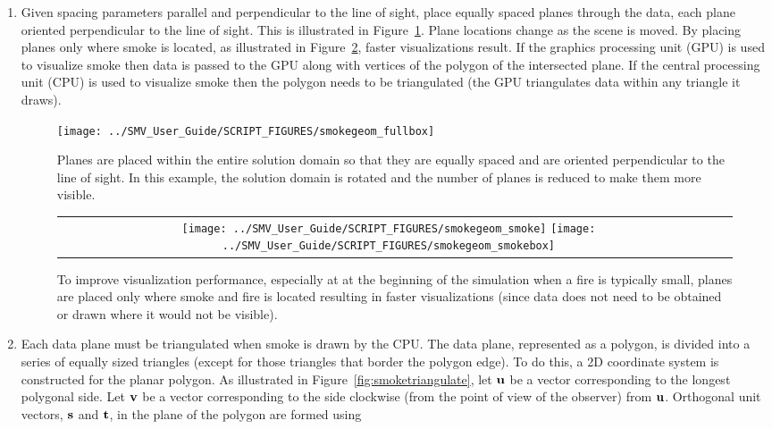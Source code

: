 {\begin{enumerate}
\item Given spacing parameters parallel and perpendicular to the line of sight, place
equally spaced planes
through the data, each plane oriented perpendicular to the line of sight.
This is illustrated in Figure~\ref{fig:smokeplanes}. Plane locations change as
the scene is moved.  By placing planes only where smoke is located, as illustrated in
Figure~\ref{fig:smokebox}, faster visualizations result.
If the graphics processing unit (GPU) is used to visualize smoke then data is passed to the GPU along with
vertices of the polygon of the intersected plane.  If the central processing unit (CPU) is used to visualize smoke then
the polygon needs to be triangulated (the GPU triangulates data within any triangle it draws).


\begin{figure}[bph]
\begin{center}
\texttt{[image: ../SMV\_User\_Guide/SCRIPT\_FIGURES/smokegeom\_fullbox]}
\end{center}
\caption{Planes are placed within the entire solution domain so that they are equally spaced and are oriented perpendicular to the line of sight. In this example, the solution domain is rotated and the number of planes is reduced to make them more visible. }
\label{fig:smokeplanes}
\end{figure}


\begin{figure}[bph]
\begin{center}
\begin{tabular}{cc}
\texttt{[image: ../SMV\_User\_Guide/SCRIPT\_FIGURES/smokegeom\_smoke]}
\texttt{[image: ../SMV\_User\_Guide/SCRIPT\_FIGURES/smokegeom\_smokebox]}
\end{tabular}
\end{center}
\caption{To improve visualization performance, especially at at the beginning of the
simulation when a fire is typically small, planes are placed only where smoke and fire is located resulting in faster visualizations (since
data does not need to be obtained or drawn where it would not be visible).}
\label{fig:smokebox}
\end{figure}

\item Each data plane must be triangulated when smoke is drawn by the CPU.  The data plane,
represented as a polygon, is divided into a series of equally sized triangles
(except for those triangles that border the polygon edge). To do this,
    a 2D coordinate
    system is constructed for the planar polygon. As illustrated in Figure~\ref{fig:smoketriangulate},
    let $\mathbf{u}$ be a vector corresponding to the longest
    polygonal side.  Let $\mathbf{v}$ be a vector corresponding to the side clockwise
    (from the point of view of the observer) from $\mathbf{u}$. Orthogonal unit vectors, $\mathbf{s}$
    and $\mathbf{t}$,
    in the plane of the polygon are formed using


\end{enumerate}}
